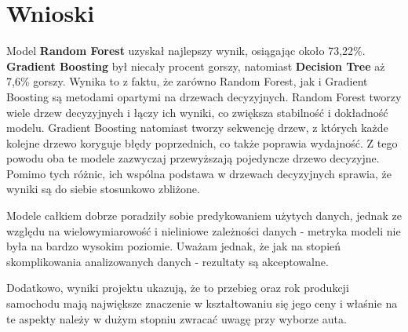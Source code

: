 \documentclass{article}
\begin{document}
\section{Wnioski}
Model \textbf{Random Forest} uzyskał najlepszy wynik, osiągając około 73,22\%. \textbf{Gradient Boosting} był niecały procent gorszy, natomiast \textbf{Decision Tree} aż 7,6\% gorszy. Wynika to z faktu, że zarówno Random Forest, jak i Gradient Boosting są metodami opartymi na drzewach decyzyjnych. Random Forest tworzy wiele drzew decyzyjnych i łączy ich wyniki, co zwiększa stabilność i dokładność modelu. Gradient Boosting natomiast tworzy sekwencję drzew, z których każde kolejne drzewo koryguje błędy poprzednich, co także poprawia wydajność. Z tego powodu oba te modele zazwyczaj przewyższają pojedyncze drzewo decyzyjne. Pomimo tych różnic, ich wspólna podstawa w drzewach decyzyjnych sprawia, że wyniki są do siebie stosunkowo zbliżone.

Modele całkiem dobrze poradziły sobie predykowaniem użytych danych, jednak ze względu na wielowymiarowość i nieliniowe zależności danych - metryka modeli nie była na bardzo wysokim poziomie. Uważam jednak, że jak na stopień skomplikowania analizowanych danych - rezultaty są akceptowalne.

Dodatkowo, wyniki projektu ukazują, że to przebieg oraz rok produkcji samochodu mają największe znaczenie w kształtowaniu się jego ceny i właśnie na te aspekty należy w dużym stopniu zwracać uwagę przy wyborze auta.

\newpage


\end{document}
